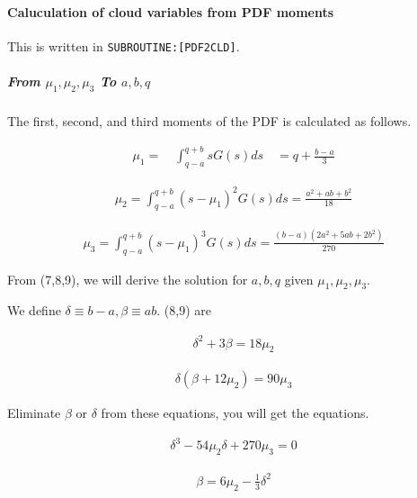\hypertarget{caluculation-of-cloud-variables-from-pdf-moments}{%
\paragraph{Caluculation of cloud variables from PDF
moments}\label{caluculation-of-cloud-variables-from-pdf-moments}}

This is written in \texttt{SUBROUTINE:{[}PDF2CLD{]}}.

\hypertarget{from-mu_1-mu_2-mu_3-to-abq}{%
\subparagraph{\texorpdfstring{From \(\mu_{1}, \mu_{2}, \mu_{3}\) To
\(a,b,q\)}{From \textbackslash mu\_\{1\}, \textbackslash mu\_\{2\}, \textbackslash mu\_\{3\} To a,b,q}}\label{from-mu_1-mu_2-mu_3-to-abq}}

The first, second, and third moments of the PDF is calculated as
follows.

\begin{eqnarray}
\mu_{1}=\quad \int_{q-a}^{q+b}sG(s)ds \quad=q+\frac{b-a}{3}
\label{E08-7}
\end{eqnarray}

\begin{eqnarray}
\mu_{2}=\int_{q-a}^{q+b}\left(s-\mu_{1}\right)^{2} G(s)ds=\frac{a^{2}+a b+b^{2}}{18}
\label{E08-8}
\end{eqnarray}

\begin{eqnarray}
\mu_{3}=\int_{q-a}^{q+b}\left(s-\mu_{1}\right)^{3} G(s)ds=\frac{(b-a)\left(2 a^{2}+5 a b+2 b^{2}\right)}{270}
\label{E08-9}
\end{eqnarray}

From (7,8,9), we will derive the solution for \(a,b , q\) given
\(\mu_{1}, \mu_{2}, \mu_{3}\).

We define \(\delta \equiv b-a, \beta \equiv a b\). (8,9) are

\begin{eqnarray}
\delta^{2}+3 \beta=18 \mu_{2}
\end{eqnarray}

\begin{eqnarray}
\delta\left(\beta+12 \mu_{2}\right)=90 \mu_{3}
\end{eqnarray}

Eliminate \(\beta\) or \(\delta\) from these equations, you will get the
equations.

\begin{eqnarray}
\delta^{3}-54 \mu_{2} \delta+270 \mu_{3}=0
\label{E08-10}
\end{eqnarray}

\begin{eqnarray}
\beta=6 \mu_{2}-\frac{1}{3} \delta^{2}
\label{E08-11}
\end{eqnarray}

